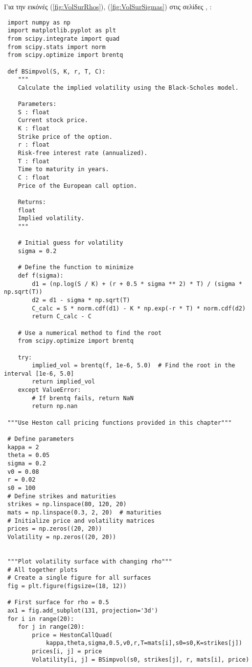\documentclass[12pt,a4paper,twoside,openany]{book}
\begin{document}
	\vspace{4mm}
	Για την εικόνές (\ref{fig:VolSurRhos}), (\ref{fig:VolSurSigmas}) στις σελίδες \pageref{fig:VolSurRhos}, \pageref{fig:VolSurSigmas}:
	\vspace{4mm} 
\begin{lstlisting}
 import numpy as np
 import matplotlib.pyplot as plt
 from scipy.integrate import quad
 from scipy.stats import norm
 from scipy.optimize import brentq
 
 def BSimpvol(S, K, r, T, C):
 	"""
 	Calculate the implied volatility using the Black-Scholes model.
 	
 	Parameters:
 	S : float
 	Current stock price.
 	K : float
 	Strike price of the option.
 	r : float
 	Risk-free interest rate (annualized).
 	T : float
 	Time to maturity in years.
 	C : float
 	Price of the European call option.
 	
 	Returns:
 	float
 	Implied volatility.
 	"""
 	
 	# Initial guess for volatility
 	sigma = 0.2
 	
 	# Define the function to minimize
 	def f(sigma):
 		d1 = (np.log(S / K) + (r + 0.5 * sigma ** 2) * T) / (sigma * np.sqrt(T))
 		d2 = d1 - sigma * np.sqrt(T)
 		C_calc = S * norm.cdf(d1) - K * np.exp(-r * T) * norm.cdf(d2)
 		return C_calc - C
 	
 	# Use a numerical method to find the root
 	from scipy.optimize import brentq
 	
 	try:
 		implied_vol = brentq(f, 1e-6, 5.0)  # Find the root in the interval [1e-6, 5.0]
 		return implied_vol
 	except ValueError:
 		# If brentq fails, return NaN
 		return np.nan
 
 """Use Heston call pricing functions provided in this chapter"""
 
 # Define parameters
 kappa = 2
 theta = 0.05
 sigma = 0.2
 v0 = 0.08
 r = 0.02
 s0 = 100
 # Define strikes and maturities
 strikes = np.linspace(80, 120, 20)
 mats = np.linspace(0.3, 2, 20)  # maturities
 # Initialize price and volatility matrices
 prices = np.zeros((20, 20))
 Volatility = np.zeros((20, 20))
 
 
 """Plot volatility surface with changing rho"""
 # All together plots
 # Create a single figure for all surfaces
 fig = plt.figure(figsize=(18, 12))
 
 # First surface for rho = 0.5
 ax1 = fig.add_subplot(131, projection='3d')
 for i in range(20):
 	for j in range(20):
 		price = HestonCallQuad(
 			kappa,theta,sigma,0.5,v0,r,T=mats[i],s0=s0,K=strikes[j])
 		prices[i, j] = price
 		Volatility[i, j] = BSimpvol(s0, strikes[j], r, mats[i], price)
 

\end{lstlisting}
\end{document}
